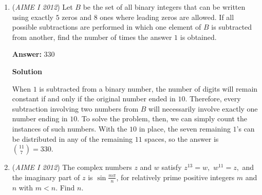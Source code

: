 \begin{enumerate}
 
 \textbf{Answer: }279



\textbf{Solution}

When they meet at the milepost, Sparky has been ridden for $n$ miles total. Assume Butch rides Sparky for $a$ miles, and Sundance rides for $n-a$ miles. Thus, we can set up an equation, given that Sparky takes $\frac{1}{6}$ hours per mile, Butch takes $\frac{1}{4}$ hours per mile, and Sundance takes $\frac{2}{5}$ hours per mile:

 
 \[\frac{a}{6} + \frac{n-a}{4} = \frac{n-a}{6} + \frac{2a}{5} \rightarrow  a = \frac{5}{19}n.\]

 The smallest possible integral value of $n$ is $19$, so we plug in $n = 19$ and $a = 5$ and get $t = \frac{13}{3}$ hours, or $260$ minutes. So our answer is $19 + 260 = \boxed{279}$.

 Note that this solution is not rigorous because it is not guaranteed that they will switch properly to form this combination.

 \href{https://artofproblemsolving.com/videos/amc/2012aimei/332}{https://artofproblemsolving.com/videos/amc/2012aimei/332}

 


	\item (\textit{AIME I 2012}) Let $B$ be the set of all binary integers that can be written using exactly $5$ zeros and $8$ ones where leading zeros are allowed. If all possible subtractions are performed in which one element of $B$ is subtracted from another, find the number of times the answer $1$ is obtained.


 
 \textbf{Answer: }330



\textbf{Solution}

When $1$ is subtracted from a binary number, the number of digits will remain constant if and only if the original number ended in $10.$ Therefore, every subtraction involving two numbers from $B$ will necessarily involve exactly one number ending in $10.$ To solve the problem, then, we can simply count the instances of such numbers. With the $10$ in place, the seven remaining $1$'s can be distributed in any of the remaining $11$ spaces, so the answer is ${11 \choose 7} = \boxed{330}$.

 


	\item (\textit{AIME I 2012}) The complex numbers $z$ and $w$ satisfy $z^{13} = w,$ $w^{11} = z,$ and the imaginary part of $z$ is $\sin{\frac{m\pi}{n}}$, for relatively prime positive integers $m$ and $n$ with $m<n.$ Find $n.$


\end{enumerate}

